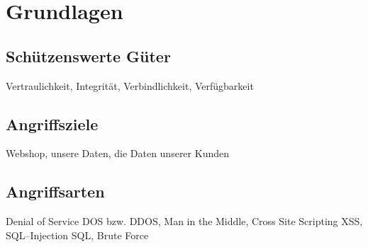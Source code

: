 \section{Grundlagen}
\label{sec:grundlagen}

\subsection{Schützenswerte Güter}

Vertraulichkeit, Integrität, Verbindlichkeit, Verfügbarkeit

\subsection{Angriffsziele}

Webshop, unsere Daten, die Daten unserer Kunden

\subsection{Angriffsarten}

Denial of Service \ac{DOS} bzw. \ac{DDOS}, Man in the Middle, Cross Site Scripting \ac{XSS}, SQL--Injection \ac{SQL}, Brute Force